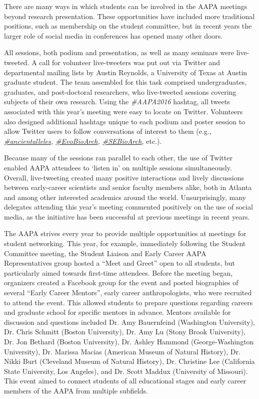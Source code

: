 \documentclass[english]{ijsra}
\begin{document}
There  are many ways in which students can be involved in the AAPA meetings beyond research presentation.  These opportunities have included more traditional positions, such as membership on the student committee, but in recent years the larger role of social media in conferences has opened many other doors.  

All sessions, both podium and presentation, as well as many seminars were live-tweeted.
A call for volunteer live-tweeters was put out via Twitter and departmental mailing lists by Austin Reynolds,
a University of Texas at Austin graduate student. 
The team assembled for this task comprised undergraduates, graduates, and post-doctoral researchers, 
who live-tweeted sessions covering subjects of their own research. 
Using the \emph{\#AAPA2016} hashtag, all tweets associated with this year’s meeting were easy to locate on Twitter. 
Volunteers also designed additional hashtags unique to each podium and poster session to allow Twitter users to
follow conversations of interest to them (e.g., \emph{\href{http://twitter.com/search?q=\%23ancientalleles\&src=typd}{\#ancientalleles}, \href{http://twitter.com/search?q=\%23EvoBioArch\&src=typd}{\#EvoBioArch}, \href{https://twitter.com/search?q=\%23SEBioArch\&src=typd}{\#SEBioArch},} etc.).

Because many of the sessions ran parallel to each other, the use of Twitter enabled AAPA attendees to ‘listen in’ on multiple sessions simultaneously. 
Overall, live-tweeting created many positive interactions and lively discussions between early-career scientists and senior faculty members alike, both in Atlanta and among other interested academics around the world.
Unsurprisingly, many delegates attending this year’s meeting commented positively on the use of social media, as the initiative has been successful at previous meetings in recent years.

\noindent The  AAPA strives every year to provide multiple opportunities at meetings for student networking.
This year, for example, immediately following the Student Committee meeting, 
the Student Liaison and Early Career AAPA Representatives group hosted a “Meet and Greet” open to all students,
but particularly aimed towards first-time attendees. 
Before the meeting began, organizers created a Facebook group for the event and posted biographies of several “Early Career Mentors”,
early career anthropologists, who were recruited to attend the event.
This allowed students to prepare questions regarding careers and graduate school for specific mentors in advance.  
Mentors available for discussion and questions included Dr. Amy Bauernfeind (Washington University),
Dr. Chris Schmitt (Boston University), Dr. Amy Lu (Stony Brook University), Dr. Jon Bethard (Boston University),
Dr. Ashley Hammond (George-Washington University), Dr. Marissa Macias (American Museum of Natural History),
Dr. Nikki Burt (Cleveland Museum of Natural History), Dr. Christine Lee (California State University, Los Angeles),
and Dr. Scott Maddux (University of Missouri).
This event aimed to connect students of all educational stages and early career members of the AAPA from multiple subfields.  
\end{document}
